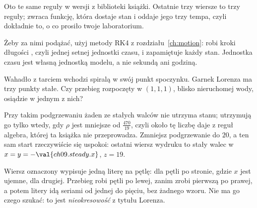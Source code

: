\noindent
Oto te same reguły w wersji z biblioteki książki. Ostatnie trzy wiersze to
trzy reguły;  zwraca funkcję, która dostaje stan i oddaje jego
trzy tempa, czyli dokładnie to, o co prosiło twoje laboratorium.


\noindent
Żeby za nimi podążać, użyj metody RK4 z rozdziału~\ref{ch:motion}:
 robi kroki długości , czyli jednej setnej jednostki
czasu, i zapamiętuje każdy stan. Jednostka czasu jest własną jednostką
modelu, a nie sekundą ani godziną.


\begin{think}
Wahadło z tarciem wchodzi spiralą w swój punkt spoczynku. Garnek Lorenza ma
trzy punkty stałe. Czy przebieg rozpoczęty w $(1, 1, 1)$, blisko
nieruchomej wody, osiądzie w jednym z nich?
\end{think}
Przy takim podgrzewaniu żaden ze stałych walców nie utrzyma stanu;
utrzymują go tylko wtedy, gdy $\rho$ jest mniejsze od $\tfrac{470}{19}$, czyli około
 \dash{} tę liczbę daje z reguł algebra, której ta
książka nie przeprowadza. Zmniejsz podgrzewanie do $20$, a ten sam start
rzeczywiście się uspokoi: ostatni wiersz wydruku to stały walec w
$x = y = -\val{ch09.steady.x}$, $z = 19$.


\noindent
Wiersz oznaczony  wypisuje jedną literę na pętlę:  dla
pętli po stronie, gdzie $x$ jest ujemne,  dla drugiej. Przebieg
robi  pętli po lewej, zanim zrobi pierwszą po prawej,
a potem litery idą seriami od jednej do pięciu, bez żadnego wzoru. Nie ma go
czego szukać: to jest \emph{nieokresowość} z tytułu Lorenza.


